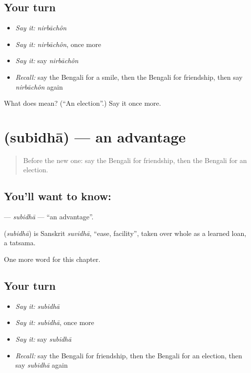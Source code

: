 \subsection*{Your turn}
\begin{itemize}
\raggedright
  \item \emph{Say it:} \emph{nirbāchôn}
  \item \emph{Say it:} \emph{nirbāchôn}, once more
  \item \emph{Say it:} say \emph{nirbāchôn}
  \item \emph{Recall:} say the Bengali for a smile, then the Bengali for friendship, then say \emph{nirbāchôn} again
\end{itemize}

\begin{tcolorbox}[breakable,colback=teal!4,colframe=teal!35!black,title={Before you move on}]
What does  mean? (\textquotedblleft{}An election\textquotedblright{}.) Say it once more.
\end{tcolorbox}
\section[\texorpdfstring{\bn{সুবিধা} (subidhā)}{সুবিধা (subidhā)}]{ (subidhā) — an advantage}

\label{lesson:BN-C254-subidha}



\begin{quote}
Before the new one: say the Bengali for friendship, then the Bengali for an election.
\end{quote}

\subsection*{You'll want to know: }
\textbf{} — \emph{subidhā} — \textquotedblleft{}an advantage\textquotedblright{}.

\begin{cousinweb}
\textbf{} (\emph{subidhā}) is Sanskrit \emph{suvidhā}, \textquotedblleft{}ease, facility\textquotedblright{}, taken over whole as a learned loan, a tatsama.
\end{cousinweb}

\begin{grammarlens}[title={What you've built}]
One more word for this chapter.
\end{grammarlens}

\subsection*{Your turn}
\begin{itemize}
\raggedright
  \item \emph{Say it:} \emph{subidhā}
  \item \emph{Say it:} \emph{subidhā}, once more
  \item \emph{Say it:} say \emph{subidhā}
  \item \emph{Recall:} say the Bengali for friendship, then the Bengali for an election, then say \emph{subidhā} again
\end{itemize}

